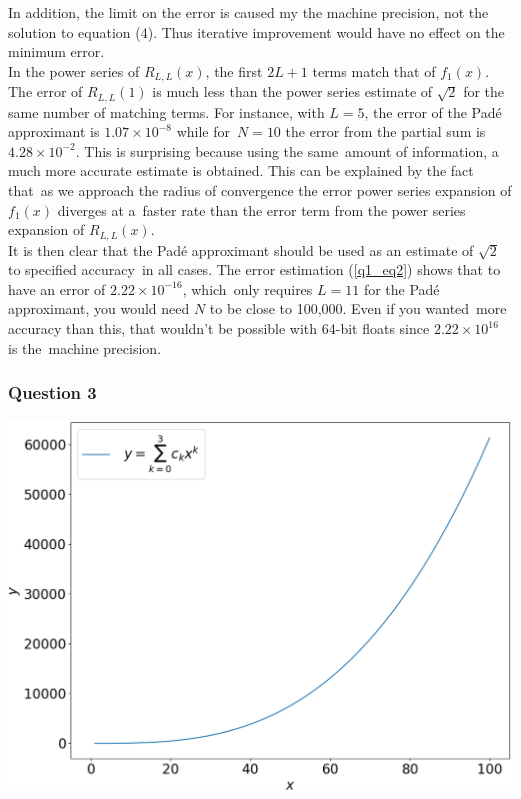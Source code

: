 \documentclass[12pt, a4paper]{article}
\begin{document}
In addition, the limit on the error is caused my the machine precision, 
not the solution to equation (4). Thus iterative improvement would have 
no effect on the minimum error.
\\

In the power series of $R_{L,L}(x)$, the first $2L+1$ terms match that 
of $f_{1}(x)$. The error of $R_{L,L}(1)$ is much less than the power 
series estimate of $\sqrt{2}$ for the same number of matching terms.
For instance, with $L = 5$, the error of the Pad\'e approximant is $1.07 \times 10^{-8}$ while for\ 
$N=10$ the error from the partial sum is $4.28 \times 10^{-2}$. This is surprising because using the same\
amount of information, a much more accurate estimate is obtained. This can be explained by the fact that\ 
as we approach the radius of convergence the error power series expansion of $f_{1}(x)$ diverges at a\
faster rate than the error term from the power series expansion of $R_{L,L}(x)$.
\\

It is then clear that the Pad\'e approximant should be used as an estimate of $\sqrt{2}$ to specified accuracy\
in all cases. The error estimation (\ref{q1_eq2}) shows that to have an error of $2.22\times10^{-16}$, which\ 
only requires $L=11$ for the Pad\'e approximant, you would need $N$ to be close to 100,000. Even if you wanted\ 
more accuracy than this, that wouldn't be possible with 64-bit floats since $2.22\times10^{16}$ is the\ 
machine precision.


\subsubsection*{Question 3}

\begin{minipage}{\textwidth}\centering
	\includegraphics[width=0.85\linewidth]{q3_N=3}

	\vspace*{-0.2cm}

	\label{q3_N=3}
\end{minipage}
\vspace{1cm}
\end{document}
